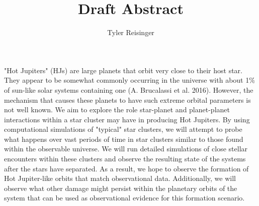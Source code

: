 \documentclass[12pt]{article}
\author{Tyler Reisinger}
\title{Draft Abstract}
\date{}
\begin{document}
\maketitle

"Hot Jupiters" (HJs) are large planets that orbit very close to their host star. 
They appear to be somewhat commonly occurring in the universe with about 1\% 
of sun-like solar systems containing one (A. Brucalassi et al. 2016). 
However, the mechanism that causes these planets to have such extreme orbital parameters
is not well known. 
We aim to explore the role star-planet and planet-planet interactions 
within a star cluster may have in producing Hot 
Jupiters. By using computational simulations of "typical" star clusters,
we will attempt to probe what happens over vast periods of time
in star clusters similar to those found within the observable universe.
We will run detailed simulations of close stellar encounters within these clusters
and observe the resulting state of the systems after the stars have separated. 
As a result, we hope to observe the formation of Hot Jupiter-like orbits that
match observational data. Additionally, we will observe what other damage might 
persist within the planetary orbits of the system that can be used as 
observational evidence for this formation scenario.
\end{document}
